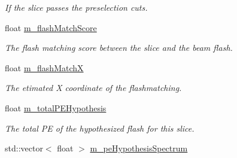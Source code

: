 \begin{DoxyCompactItemize}
\begin{DoxyCompactList}\small\item\em If the slice passes the preselection cuts. \end{DoxyCompactList}\item 
\hypertarget{classflashmatch_1_1FlashMatchingTool_1_1SliceCandidate_ae6023270d1a2728a7cdd24dadd05b006}{float \hyperlink{classflashmatch_1_1FlashMatchingTool_1_1SliceCandidate_ae6023270d1a2728a7cdd24dadd05b006}{m\-\_\-flash\-Match\-Score}}\label{classflashmatch_1_1FlashMatchingTool_1_1SliceCandidate_ae6023270d1a2728a7cdd24dadd05b006}

\begin{DoxyCompactList}\small\item\em The flash matching score between the slice and the beam flash. \end{DoxyCompactList}\item 
\hypertarget{classflashmatch_1_1FlashMatchingTool_1_1SliceCandidate_aec191712b4926ad8aa36c1d2cec63b72}{float \hyperlink{classflashmatch_1_1FlashMatchingTool_1_1SliceCandidate_aec191712b4926ad8aa36c1d2cec63b72}{m\-\_\-flash\-Match\-X}}\label{classflashmatch_1_1FlashMatchingTool_1_1SliceCandidate_aec191712b4926ad8aa36c1d2cec63b72}

\begin{DoxyCompactList}\small\item\em The etimated X coordinate of the flashmatching. \end{DoxyCompactList}\item 
\hypertarget{classflashmatch_1_1FlashMatchingTool_1_1SliceCandidate_a00f51554630d8efb1e510956b4cc01c7}{float \hyperlink{classflashmatch_1_1FlashMatchingTool_1_1SliceCandidate_a00f51554630d8efb1e510956b4cc01c7}{m\-\_\-total\-P\-E\-Hypothesis}}\label{classflashmatch_1_1FlashMatchingTool_1_1SliceCandidate_a00f51554630d8efb1e510956b4cc01c7}

\begin{DoxyCompactList}\small\item\em The total P\-E of the hypothesized flash for this slice. \end{DoxyCompactList}\item 
\hypertarget{classflashmatch_1_1FlashMatchingTool_1_1SliceCandidate_a349938ff23f29896d514cb5f1165ecae}{std\-::vector$<$ float $>$ \hyperlink{classflashmatch_1_1FlashMatchingTool_1_1SliceCandidate_a349938ff23f29896d514cb5f1165ecae}{m\-\_\-pe\-Hypothesis\-Spectrum}}\label{classflashmatch_1_1FlashMatchingTool_1_1SliceCandidate_a349938ff23f29896d514cb5f1165ecae}


\end{DoxyCompactItemize}
